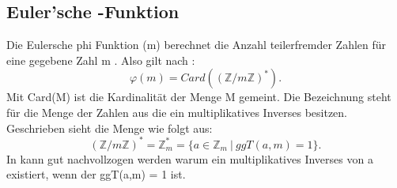 		\subsection{Euler’sche \myPhi -Funktion}
			Die Eulersche phi Funktion \myPhi(m) berechnet die Anzahl teilerfremder Zahlen für eine gegebene Zahl m . Also gilt nach \cite{Algorithmische:Zahlentheorie}: 
			\begin{displaymath}
				\varphi(m) = Card((\mathbb{Z}/m\mathbb{Z})^*).
			\end{displaymath}			
			Mit Card(M) ist die Kardinalität der Menge M gemeint. Die Bezeichnung  steht für die Menge der Zahlen aus  die ein multiplikatives Inverses besitzen. Geschrieben sieht die Menge wie folgt aus:
			\begin{displaymath}
				(\mathbb{Z}/m\mathbb{Z})^* = \mathbb{Z}_m^* = \{a \in \mathbb{Z}_m ~|~ggT(a,m) = 1\}.
			\end{displaymath}
			In \cite{Mathematik:fuer:Informatiker} kann gut nachvollzogen werden warum ein multiplikatives Inverses von a existiert, wenn der ggT(a,m) = 1 ist.
		
		
		
		
		